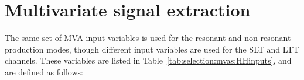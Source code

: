 \section{Multivariate signal extraction}
\label{sec:DiHiggs:MVA}


The same set of MVA input variables is used for the resonant and non-resonant production modes, 
though different input variables are used for the SLT and LTT channels. 
These variables are listed in Table~\ref{tab:selection:mvas:HHinputs}, and are defined as follows:
